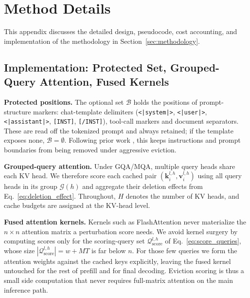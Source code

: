 \documentclass{article} %
\begin{document}
\section{Method Details} \label{app:method_details}
This appendix discusses the detailed design, pseudocode, cost accounting, and implementation of the methodology in Section~\ref{sec:methodology}. 

\subsection{Implementation: Protected Set, Grouped-Query Attention, Fused Kernels}
\label{app:implementation}
\label{app:setup_details}
\label{app:gqa}
\label{app:kernels}

\textbf{Protected positions.}
The optional set $\mathcal{B}$ holds the positions of prompt-structure markers: chat-template delimiters (\verb!<|system|>!, \verb!<|user|>!, \verb!<|assistant|>!, \verb![INST]!, \verb![/INST]!), tool-call markers and document separators. These are read off the tokenized prompt and always retained; if the template exposes none, $\mathcal{B}=\emptyset$. Following prior work \citep{xiao2023streamingllm,li2024snapkv}, this keeps instructions and prompt boundaries from being removed under aggressive eviction. 

\textbf{Grouped-query attention.}
Under GQA/MQA, multiple query heads share each KV head. We therefore score each cached pair $(\mathbf{k}^{l,h}_{i},\mathbf{v}^{l,h}_{i})$ using all query heads in its group $\mathcal{G}(h)$ and aggregate their deletion effects from Eq.~\eqref{eq:deletion_effect}. Throughout, $H$ denotes the number of KV heads, and cache budgets are assigned at the KV-head level.

\textbf{Fused attention kernels.}
Kernels such as FlashAttention never materialize the $n\times n$ attention matrix a perturbation score needs. We avoid kernel surgery by computing scores only for the scoring-query set $\mathcal{Q}^{l,h}_{\mathrm{score}}$ of Eq.~\eqref{eq:score_queries}, whose size $|\mathcal{Q}^{l,h}_{\mathrm{score}}|=w+MT$ is far below $n$. For those few queries we form the attention weights against the cached keys explicitly, leaving the fused kernel untouched for the rest of prefill and for final decoding. Eviction scoring is thus a small side computation that never requires full-matrix attention on the main inference path.
\end{document}
